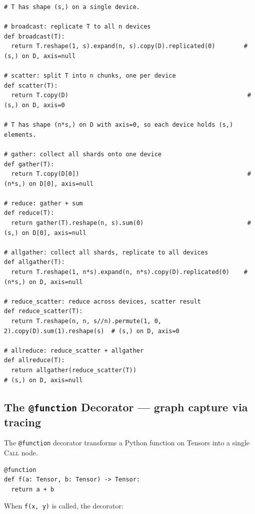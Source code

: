 \documentclass[10pt,letterpaper]{article}
\newcommand{\op}[1]{\textsc{#1}}
\begin{document}
\begin{lstlisting}
# T has shape (s,) on a single device.

# broadcast: replicate T to all n devices
def broadcast(T):
  return T.reshape(1, s).expand(n, s).copy(D).replicated(0)        # (s,) on D, axis=null

# scatter: split T into n chunks, one per device
def scatter(T):
  return T.copy(D)                                                  # (s,) on D, axis=0

# T has shape (n*s,) on D with axis=0, so each device holds (s,) elements.

# gather: collect all shards onto one device
def gather(T):
  return T.copy(D[0])                                               # (n*s,) on D[0], axis=null

# reduce: gather + sum
def reduce(T):
  return gather(T).reshape(n, s).sum(0)                             # (s,) on D[0], axis=null

# allgather: collect all shards, replicate to all devices
def allgather(T):
  return T.reshape(1, n*s).expand(n, n*s).copy(D).replicated(0)    # (n*s,) on D, axis=null

# reduce_scatter: reduce across devices, scatter result
def reduce_scatter(T):
  return T.reshape(n, n, s//n).permute(1, 0, 2).copy(D).sum(1).reshape(s)  # (s,) on D, axis=0

# allreduce: reduce_scatter + allgather
def allreduce(T):
  return allgather(reduce_scatter(T))                                       # (s,) on D, axis=null
\end{lstlisting}

\subsection*{{\color{callblue}The \texttt{@function} Decorator} \normalfont\small--- graph capture via tracing}

The \texttt{@function} decorator transforms a Python function on Tensors into a single \op{Call} node.

\begin{lstlisting}
@function
def f(a: Tensor, b: Tensor) -> Tensor:
  return a + b
\end{lstlisting}

When \texttt{f(x, y)} is called, the decorator:
\end{document}
